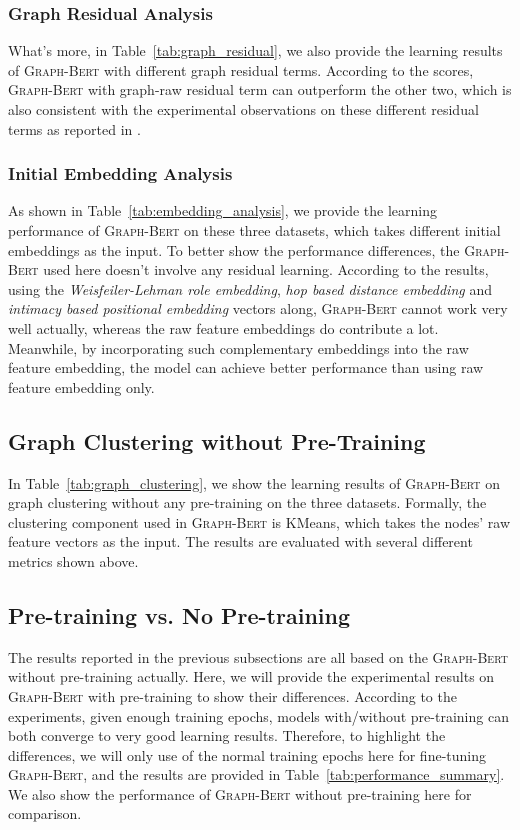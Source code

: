 \documentclass{article}
\newcommand{\our}{\textsc{Graph-Bert}}
\begin{document}
\subsubsection{Graph Residual Analysis}

What's more, in Table~\ref{tab:graph_residual}, we also provide the learning results of {\our} with different graph residual terms. According to the scores, {\our} with graph-raw residual term can outperform the other two, which is also consistent with the experimental observations on these different residual terms as reported in \cite{Zhang2019GResNetGR}.

\subsubsection{Initial Embedding Analysis}

As shown in Table~\ref{tab:embedding_analysis}, we provide the learning performance of {\our} on these three datasets, which takes different initial embeddings as the input. To better show the performance differences, the {\our} used here doesn't involve any residual learning. According to the results, using the \textit{Weisfeiler-Lehman role embedding}, \textit{hop based distance embedding} and \textit{intimacy based positional embedding} vectors along, {\our} cannot work very well actually, whereas the raw feature embeddings do contribute a lot. Meanwhile, by incorporating such complementary embeddings into the raw feature embedding, the model can achieve better performance than using raw feature embedding only.

\subsection{Graph Clustering without Pre-Training}

In Table~\ref{tab:graph_clustering}, we show the learning results of {\our} on graph clustering without any pre-training on the three datasets. Formally, the clustering component used in {\our} is KMeans, which takes the nodes' raw feature vectors as the input. The results are evaluated with several different metrics shown above.

\subsection{Pre-training vs. No Pre-training}\label{subsec:pre_train_result}


The results reported in the previous subsections are all based on the {\our} without pre-training actually. Here, we will provide the experimental results on {\our} with pre-training to show their differences. According to the experiments, given enough training epochs, models with/without pre-training can both converge to very good learning results. Therefore, to highlight the differences, we will only use  of the normal training epochs here for fine-tuning {\our}, and the results are provided in Table~\ref{tab:performance_summary}. We also show the performance of {\our} without pre-training here for comparison.
\end{document}
